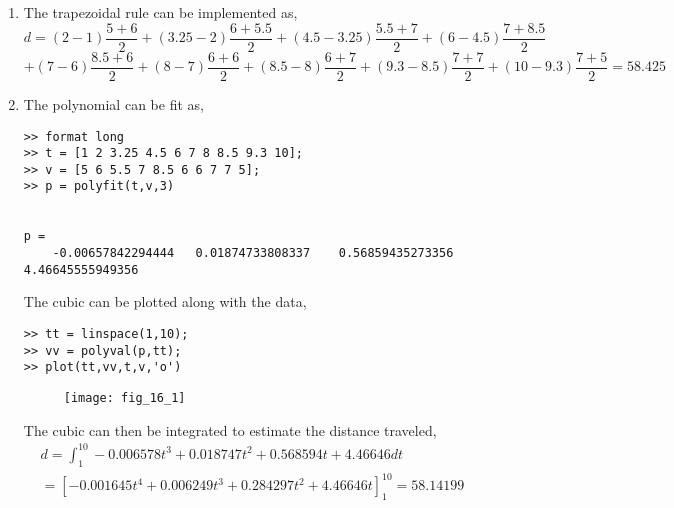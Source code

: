 \documentclass[../main.tex]{subfiles}
\begin{document}
\section{}
\begin{enumerate}[label=\bfseries(\alph*)]
\item The trapezoidal rule can be implemented as,
	\bigbreak
$d=(2-1) \dfrac{5+6}{2}+(3.25-2) \dfrac{6+5.5}{2}+(4.5-3.25) \dfrac{5.5+7}{2}+(6-4.5) \dfrac{7+8.5}{2}$
	\bigbreak
$+(7-6) \dfrac{8.5+6}{2}+(8-7) \dfrac{6+6}{2}+(8.5-8) \dfrac{6+7}{2}+(9.3-8.5) \dfrac{7+7}{2}+(10-9.3) \dfrac{7+5}{2}=58.425$
	\bigbreak
\item  The polynomial can be fit as,
	\bigbreak
\begin{lstlisting}[numbers=none]
>> format long
>> t = [1 2 3.25 4.5 6 7 8 8.5 9.3 10];
>> v = [5 6 5.5 7 8.5 6 6 7 7 5];
>> p = polyfit(t,v,3)


p =
	-0.00657842294444	0.01874733808337	0.56859435273356
4.46645555949356 
\end{lstlisting}
	\bigbreak
The cubic can be plotted along with the data,
	\bigbreak
\begin{lstlisting}[numbers=none]
>> tt = linspace(1,10);
>> vv = polyval(p,tt);
>> plot(tt,vv,t,v,'o') 
\end{lstlisting}
	\bigbreak
	\begin{figure}[H]
		\texttt{[image: fig\_16\_1]}
		\label{fig:fig_16_1}
	\end{figure}
	\bigbreak
The cubic can then be integrated to estimate the distance traveled,
	\bigbreak
$
\begin{aligned}
&d =\int_{1}^{10}-0.006578 t^{3}+0.018747 t^{2}+0.568594 t+4.46646 d t \\
&=\left[-0.001645 t^{4}+0.006249 t^{3}+0.284297 t^{2}+4.46646 t\right]_{1}^{10}=58.14199
\end{aligned}
$
\end{enumerate}
	\bigbreak
\end{document}
